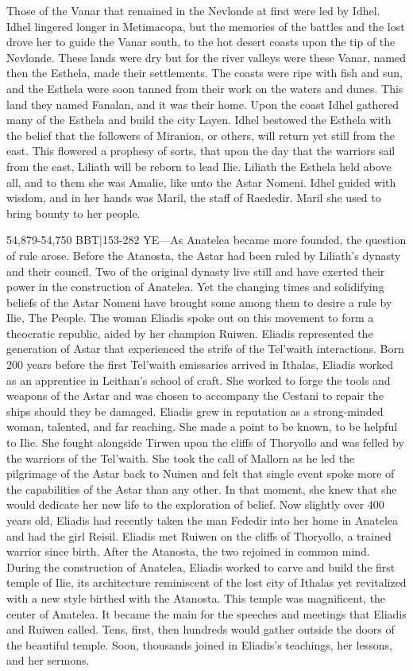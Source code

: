 \documentclass[smalldemyvopaper,11pt,twoside,onecolumn,openright,extrafontsizes]{memoir}
\begin{document}
Those of the Vanar that remained in the Nevlonde at first were led by Idhel. Idhel lingered longer in Metimacopa, but the memories of the battles and the lost drove her to guide the Vanar south, to the hot desert coasts upon the tip of the Nevlonde. These lands were dry but for the river valleys were these Vanar, named then the Esthela, made their settlements. The coasts were ripe with fish and sun, and the Esthela were soon tanned from their work on the waters and dunes. This land they named Fanalan, and it was their home. Upon the coast Idhel gathered many of the Esthela and build the city Layen.
Idhel bestowed the Esthela with the belief that the followers of Miranion, or others, will return yet still from the east. This flowered a prophesy of sorts, that upon the day that the warriors sail from the east, Liliath will be reborn to lead Ilie. Liliath the Esthela held above all, and to them she was Amalie, like unto the Astar Nomeni. Idhel guided with wisdom, and in her hands was Maril, the staff of Raededir. Maril she used to bring bounty to her people.

54,879-54,750 BBT|153-282 YE—As Anatelea became more founded, the question of rule arose. Before the Atanosta, the Astar had been ruled by Liliath’s dynasty and their council. Two of the original dynasty live still and have exerted their power in the construction of Anatelea. Yet the changing times and solidifying beliefs of the Astar Nomeni have brought some among them to desire a rule by Ilie, The People. The woman Eliadis spoke out on this movement to form a theocratic republic, aided by her champion Ruiwen.
	Eliadis represented the generation of Astar that experienced the strife of the Tel’waith interactions. Born 200 years before the first Tel’waith emissaries arrived in Ithalas, Eliadis worked as an apprentice in Leithan’s school of craft. She worked to forge the tools and weapons of the Astar and was chosen to accompany the Cestani to repair the ships should they be damaged. Eliadis grew in reputation as a strong-minded woman, talented, and far reaching. She made a point to be known, to be helpful to Ilie. She fought alongside Tirwen upon the cliffs of Thoryollo and was felled by the warriors of the Tel’waith. She took the call of Mallorn as he led the pilgrimage of the Astar back to Nuinen and felt that single event spoke more of the capabilities of the Astar than any other. In that moment, she knew that she would dedicate her new life to the exploration of belief. Now slightly over 400 years old, Eliadis had recently taken the man Fededir into her home in Anatelea and had the girl Reisil.
	Eliadis met Ruiwen on the cliffs of Thoryollo, a trained warrior since birth. After the Atanosta, the two rejoined in common mind. During the construction of Anatelea, Eliadis worked to carve and build the first temple of Ilie, its architecture reminiscent of the lost city of Ithalas yet revitalized with a new style birthed with the Atanosta. This temple was magnificent, the center of Anatelea. It became the main for the speeches and meetings that Eliadis and Ruiwen called. Tens, first, then hundreds would gather outside the doors of the beautiful temple. Soon, thousands joined in Eliadis’s teachings, her lessons, and her sermons.
\end{document}
